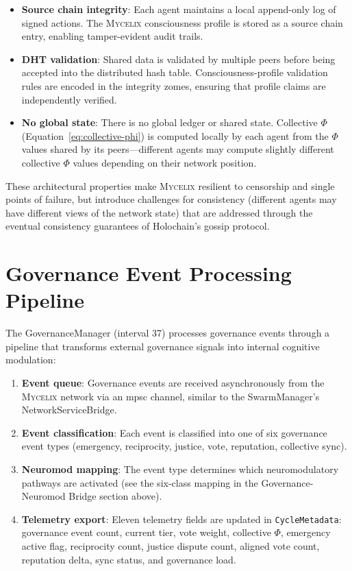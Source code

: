 \documentclass[12pt]{book}
\newcommand{\mycelix}{\textsc{Mycelix}}
\begin{document}
\begin{itemize}
  \item \textbf{Source chain integrity}: Each agent maintains a local append-only log of signed actions. The \mycelix{} consciousness profile is stored as a source chain entry, enabling tamper-evident audit trails.
  \item \textbf{DHT validation}: Shared data is validated by multiple peers before being accepted into the distributed hash table. Consciousness-profile validation rules are encoded in the integrity zomes, ensuring that profile claims are independently verified.
  \item \textbf{No global state}: There is no global ledger or shared state. Collective $\Phi$ (Equation~\ref{eq:collective-phi}) is computed locally by each agent from the $\Phi$ values shared by its peers---different agents may compute slightly different collective $\Phi$ values depending on their network position.
\end{itemize}

These architectural properties make \mycelix{} resilient to censorship and single points of failure, but introduce challenges for consistency (different agents may have different views of the network state) that are addressed through the eventual consistency guarantees of Holochain's gossip protocol.

\section{Governance Event Processing Pipeline}

The GovernanceManager (interval 37) processes governance events through a pipeline that transforms external governance signals into internal cognitive modulation:

\begin{enumerate}
  \item \textbf{Event queue}: Governance events are received asynchronously from the \mycelix{} network via an mpsc channel, similar to the SwarmManager's NetworkServiceBridge.
  \item \textbf{Event classification}: Each event is classified into one of six governance event types (emergency, reciprocity, justice, vote, reputation, collective sync).
  \item \textbf{Neuromod mapping}: The event type determines which neuromodulatory pathways are activated (see the six-class mapping in the Governance-Neuromod Bridge section above).
  \item \textbf{Telemetry export}: Eleven telemetry fields are updated in \texttt{CycleMetadata}: governance event count, current tier, vote weight, collective $\Phi$, emergency active flag, reciprocity count, justice dispute count, aligned vote count, reputation delta, sync status, and governance load.
\end{enumerate}
\end{document}
